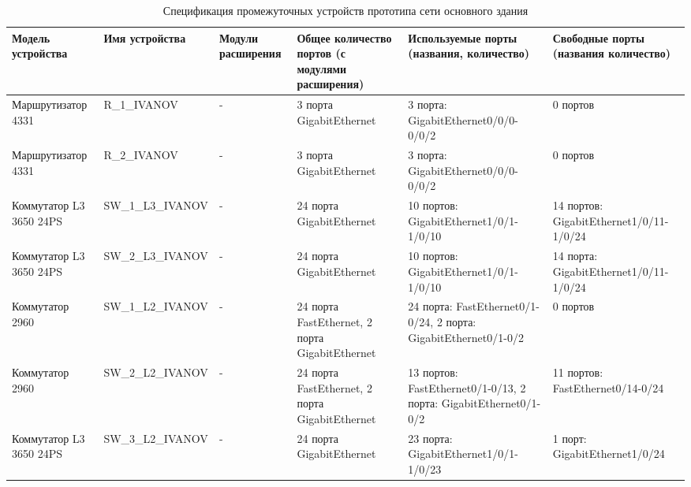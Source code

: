 \documentclass[14pt, a4paper]{extarticle}
\begin{document}
\begin{landscape}\pagestyle{empty}\newpage
\begin{table}[H]
  \caption{Спецификация промежуточных устройств прототипа сети основного здания\label{tab:hq_device_spec}}
  \centering
  \small
  \begin{tabulary}{\linewidth}{|L|L|L|L|L|L|}
    \hline
    Модель устройства       & Имя устройства                                     & Модули расширения & Общее количество портов (с модулями расширения) & Используемые порты (названия, количество)                        & Свободные порты (названия количество) \\ \hline
    Маршрутизатор 4331      & R\allowbreak\_1\allowbreak\_IVANOV                 & -                 & 3 порта GigabitEthernet                         & 3 порта: GigabitEthernet0/0/0-0/0/2                              & 0 портов \\ \hline
    Маршрутизатор 4331      & R\allowbreak\_2\allowbreak\_IVANOV                 & -                 & 3 порта GigabitEthernet                         & 3 порта: GigabitEthernet0/0/0-0/0/2                              & 0 портов \\ \hline
    Коммутатор L3 3650 24PS & SW\allowbreak\_1\allowbreak\_L3\allowbreak\_IVANOV & -                 & 24 порта GigabitEthernet                        & 10 портов: GigabitEthernet1/0/1-1/0/10                           & 14 портов: GigabitEthernet1/0/11-1/0/24 \\ \hline
    Коммутатор L3 3650 24PS & SW\allowbreak\_2\allowbreak\_L3\allowbreak\_IVANOV & -                 & 24 порта GigabitEthernet                        & 10 портов: GigabitEthernet1/0/1-1/0/10                           & 14 порта: GigabitEthernet1/0/11-1/0/24 \\ \hline
    Коммутатор 2960         & SW\allowbreak\_1\allowbreak\_L2\allowbreak\_IVANOV & -                 & 24 порта FastEthernet, 2 порта GigabitEthernet  & 24 порта: FastEthernet0/1-0/24, 2 порта: GigabitEthernet0/1-0/2  & 0 портов \\ \hline
    Коммутатор 2960         & SW\allowbreak\_2\allowbreak\_L2\allowbreak\_IVANOV & -                 & 24 порта FastEthernet, 2 порта GigabitEthernet  & 13 портов: FastEthernet0/1-0/13, 2 порта: GigabitEthernet0/1-0/2 & 11 портов: FastEthernet0/14-0/24 \\ \hline
    Коммутатор L3 3650 24PS & SW\allowbreak\_3\allowbreak\_L2\allowbreak\_IVANOV & -                 & 24 порта GigabitEthernet                        & 23 порта: GigabitEthernet1/0/1-1/0/23                            & 1 порт: GigabitEthernet1/0/24 \\ \hline

\end{tabulary}
\end{table}
\end{landscape}
\end{document}
